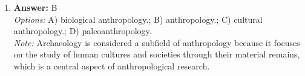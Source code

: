 \documentclass[12pt]{article}
\begin{document}
\begin{enumerate}[label=\arabic*.]
\\ \textit{Note:} The transition from food gathering to a total reliance on agriculture took thousands of years because it involved gradual changes in human society, including the domestication of plants and animals, shifts in settlement patterns, and cultural adaptations that required time to develop and stabilize.
\item \textbf{Answer:} B
\\ \textit{Options:} A) biological anthropology.; B) anthropology.; C) cultural anthropology.; D) paleoanthropology.
\\ \textit{Note:} Archaeology is considered a subfield of anthropology because it focuses on the study of human cultures and societies through their material remains, which is a central aspect of anthropological research.
\end{enumerate}
\end{document}
